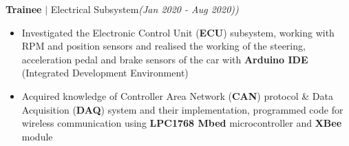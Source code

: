 \documentclass[10pt, a4paper]{article}
\newcommand{\rhsmalle}[1]{\hfill{\footnotesize{\textsl{(#1)}}}\\[-12pt]}
\begin{document}
{\small\textbf{Trainee} \small$\mid$ Electrical Subsystem}\rhsmalle{Jan 2020 - Aug 2020)}
\begin{itemize}
	\item Investigated the {Electronic Control Unit} (\textbf{ECU}) subsystem, working with {RPM} and {position sensors} and realised the working of the steering, acceleration pedal and brake sensors of the car with \textbf{Arduino IDE} (Integrated Development Environment)
	\item Acquired knowledge of {Controller Area Network} (\textbf{CAN}) protocol \& {Data Acquisition} (\textbf{DAQ}) system and their implementation, programmed code for wireless communication using \textbf{LPC1768 Mbed} microcontroller and \textbf{XBee} module
\end{itemize}
\end{document}

